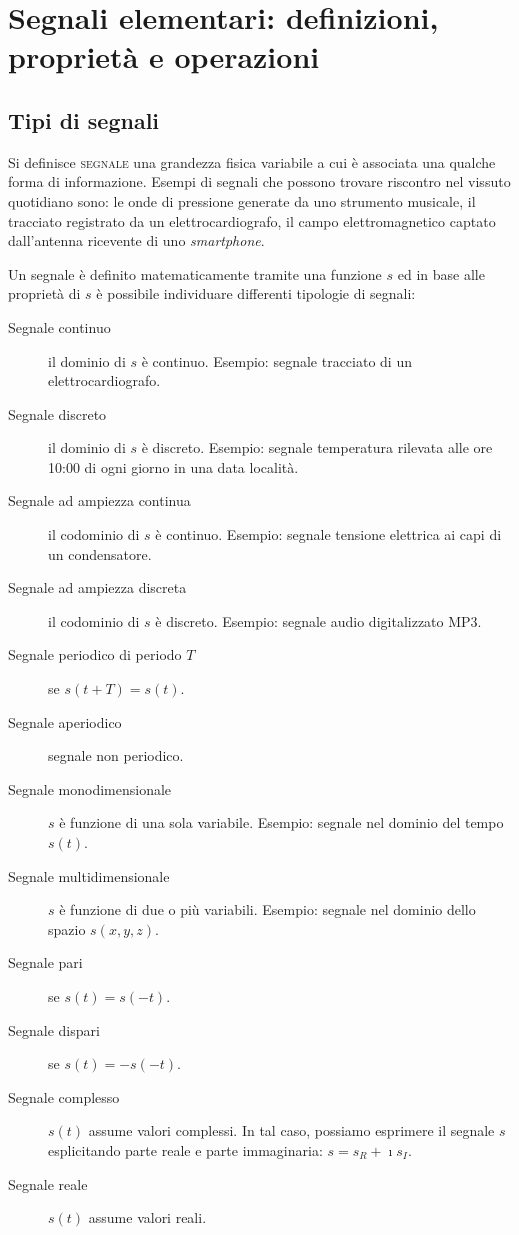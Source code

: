 \chapter{Segnali elementari: definizioni, proprietà e operazioni}
\label{ch:teoriasegnali-capitolo1}
\section{Tipi di segnali}
Si definisce \textsc{segnale} una grandezza fisica variabile a cui è associata una qualche forma di informazione. Esempi di segnali che possono trovare riscontro nel vissuto quotidiano sono: le onde di pressione generate da uno strumento musicale, il tracciato registrato da un elettrocardiografo, il campo elettromagnetico captato dall'antenna ricevente di uno \emph{smartphone}.

Un segnale è definito matematicamente tramite una funzione $s$ ed in base alle proprietà di $s$ è possibile individuare differenti tipologie di segnali:
\begin{description}
	\item[Segnale continuo] il dominio di $s$ è continuo. Esempio: segnale tracciato di un elettrocardiografo.
	\item[Segnale discreto] il dominio di $s$ è discreto. Esempio: segnale temperatura rilevata alle ore 10:00 di ogni giorno in una data località.
	\item[Segnale ad ampiezza continua] il codominio di $s$ è continuo. Esempio: segnale tensione elettrica ai capi di un condensatore.
	\item[Segnale ad ampiezza discreta] il codominio di $s$ è discreto. Esempio: segnale audio digitalizzato MP3.
	\item[Segnale periodico di periodo $T$] se $s(t+T)=s(t)$.
	\item[Segnale aperiodico] segnale non periodico.
	\item[Segnale monodimensionale] $s$ è funzione di una sola variabile. Esempio: segnale nel dominio del tempo $s(t)$.
	\item[Segnale multidimensionale] $s$ è funzione di due o più variabili. Esempio: segnale nel dominio dello spazio $s(x,y,z)$.
	\item[Segnale pari] se $s(t)=s(-t)$.
	\item[Segnale dispari] se $s(t)=-s(-t)$.
	\item[Segnale complesso] $s(t)$ assume valori complessi. In tal caso, possiamo esprimere il segnale $s$ esplicitando parte reale e parte immaginaria: $s=s_R+\imath s_I$.
	\item[Segnale reale] $s(t)$ assume valori reali.
\end{description}

